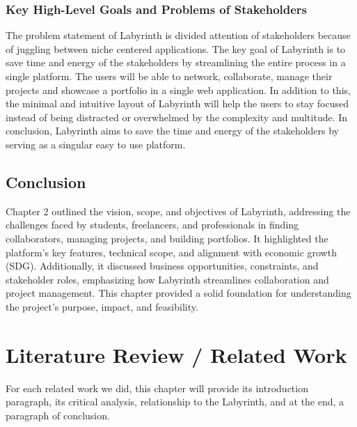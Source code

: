 \documentclass{FastFyp}
\begin{document}
\subsection{Key High-Level Goals and Problems of Stakeholders}
The problem statement of Labyrinth is divided attention of stakeholders because of juggling between niche centered applications. The key goal of Labyrinth is to save time and energy of the stakeholders by streamlining the entire process in a single platform. The users will be able to network, collaborate, manage their projects and showcase a portfolio in a single web application. In addition to this, the minimal and intuitive layout of Labyrinth will help the  users to stay focused instead of being distracted or overwhelmed by the complexity and multitude. In conclusion, Labyrinth aims to save the time and energy of the stakeholders by serving as a singular easy to use platform.
\section{Conclusion}
Chapter 2 outlined the vision, scope, and objectives of Labyrinth, addressing the challenges faced by students, freelancers, and professionals in finding collaborators, managing projects, and building portfolios. It highlighted the platform’s key features, technical scope, and alignment with economic growth (SDG). Additionally, it discussed business opportunities, constraints, and stakeholder roles, emphasizing how Labyrinth streamlines collaboration and project management. This chapter provided a solid foundation for understanding the project’s purpose, impact, and feasibility.






\chapter{Literature Review / Related Work}
For each related work we did, this chapter will provide its introduction paragraph, its critical analysis, relationship to the Labyrinth, and at the end, a paragraph of conclusion.
\end{document}
